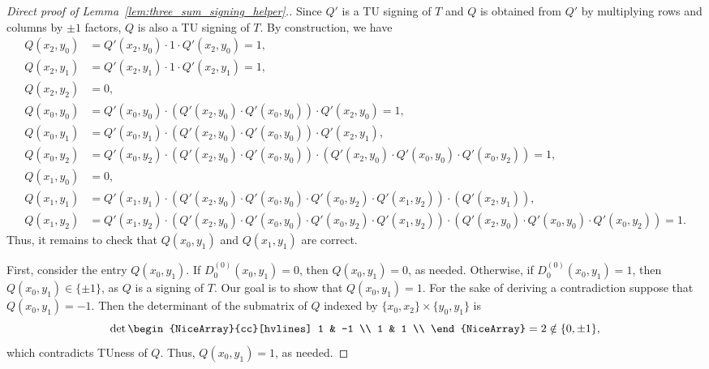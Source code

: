 \documentclass{article}
\theoremstyle{definition}
\begin{document}
\begin{proof}[Direct proof of Lemma~\ref{lem:three_sum_signing_helper}.]
    Since $Q'$ is a TU signing of $T$ and $Q$ is obtained from $Q'$ by multiplying rows and columns by $\pm 1$ factors, $Q$ is also a TU signing of $T$. By construction, we have
    \begin{align*}
        Q (x_{2}, y_{0}) &= Q' (x_{2}, y_{0}) \cdot 1 \cdot Q' (x_{2}, y_{0}) = 1, \\
        Q (x_{2}, y_{1}) &= Q' (x_{2}, y_{1}) \cdot 1 \cdot Q' (x_{2}, y_{1}) = 1, \\
        Q (x_{2}, y_{2}) &= 0, \\
        Q (x_{0}, y_{0}) &= Q' (x_{0}, y_{0}) \cdot (Q' (x_{2}, y_{0}) \cdot Q' (x_{0}, y_{0})) \cdot Q' (x_{2}, y_{0}) = 1, \\
        Q (x_{0}, y_{1}) &= Q' (x_{0}, y_{1}) \cdot (Q' (x_{2}, y_{0}) \cdot Q' (x_{0}, y_{0})) \cdot Q' (x_{2}, y_{1}), \\
        Q (x_{0}, y_{2}) &= Q' (x_{0}, y_{2}) \cdot (Q' (x_{2}, y_{0}) \cdot Q' (x_{0}, y_{0})) \cdot (Q' (x_{2}, y_{0}) \cdot Q' (x_{0}, y_{0}) \cdot Q' (x_{0}, y_{2})) = 1, \\
        Q (x_{1}, y_{0}) &= 0, \\
        Q (x_{1}, y_{1}) &= Q' (x_{1}, y_{1}) \cdot (Q' (x_{2}, y_{0}) \cdot Q' (x_{0}, y_{0}) \cdot Q' (x_{0}, y_{2}) \cdot Q' (x_{1}, y_{2})) \cdot (Q' (x_{2}, y_{1})), \\
        Q (x_{1}, y_{2}) &= Q' (x_{1}, y_{2}) \cdot (Q' (x_{2}, y_{0}) \cdot Q' (x_{0}, y_{0}) \cdot Q' (x_{0}, y_{2}) \cdot Q' (x_{1}, y_{2})) \cdot (Q' (x_{2}, y_{0}) \cdot Q' (x_{0}, y_{0}) \cdot Q' (x_{0}, y_{2})) = 1.
    \end{align*}
    Thus, it remains to check that $Q (x_{0}, y_{1})$ and $Q (x_{1}, y_{1})$ are correct.

    First, consider the entry $Q (x_{0}, y_{1})$. If $D_{0}^{(0)} (x_{0}, y_{1}) = 0$, then $Q (x_{0}, y_{1}) = 0$, as needed. Otherwise, if $D_{0}^{(0)} (x_{0}, y_{1}) = 1$, then $Q (x_{0}, y_{1}) \in \{\pm 1\}$, as $Q$ is a signing of $T$. Our goal is to show that $Q (x_{0}, y_{1}) = 1$. For the sake of deriving a contradiction suppose that $Q (x_{0}, y_{1}) = -1$. Then the determinant of the submatrix of $Q$ indexed by $\{x_{0}, x_{2}\} \times \{y_{0}, y_{1}\}$ is
    \[
        \det \begin{NiceArray}{cc}[hvlines] 1 & -1 \\ 1 & 1 \\ \end{NiceArray} = 2 \notin \{0, \pm 1\},
    \]
    which contradicts TUness of $Q$. Thus, $Q (x_{0}, y_{1}) = 1$, as needed.


\end{proof}
\end{document}

